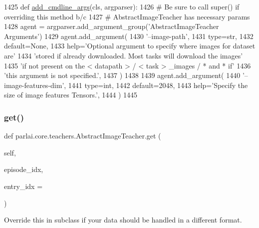 \begin{DoxyCode}
1425     \textcolor{keyword}{def }\hyperlink{namespaceparlai_1_1agents_1_1drqa_1_1config_a62fdd5554f1da6be0cba185271058320}{add\_cmdline\_args}(cls, argparser):
1426         \textcolor{comment}{# Be sure to call super() if overriding this method b/c}
1427         \textcolor{comment}{# AbstractImageTeacher has necessary params}
1428         agent = argparser.add\_argument\_group(\textcolor{stringliteral}{'AbstractImageTeacher Arguments'})
1429         agent.add\_argument(
1430             \textcolor{stringliteral}{'--image-path'},
1431             type=str,
1432             default=\textcolor{keywordtype}{None},
1433             help=\textcolor{stringliteral}{'Optional argument to specify where images for dataset are'}
1434             \textcolor{stringliteral}{'stored if already downloaded. Most tasks will download the images'}
1435             \textcolor{stringliteral}{'if not present on the < datapath > / < task > \_images / * and * if'}
1436             \textcolor{stringliteral}{'this argument is not specified.'},
1437         )
1438 
1439         agent.add\_argument(
1440             \textcolor{stringliteral}{'--image-features-dim'},
1441             type=int,
1442             default=2048,
1443             help=\textcolor{stringliteral}{'Specify the size of image features Tensors.'},
1444         )
1445 
\end{DoxyCode}
\mbox{\label{classparlai_1_1core_1_1teachers_1_1AbstractImageTeacher_ae2f395708462355b28888be7a434ebf4}} 
\subsubsection{\texorpdfstring{get()}{get()}}
{\footnotesize\ttfamily def parlai.\+core.\+teachers.\+Abstract\+Image\+Teacher.\+get (\begin{DoxyParamCaption}\item[{}]{self,  }\item[{}]{episode\+\_\+idx,  }\item[{}]{entry\+\_\+idx = {} }\end{DoxyParamCaption})}

\begin{DoxyVerb}Override this in subclass if your data should be handled in a different format.
\end{DoxyVerb}
 

